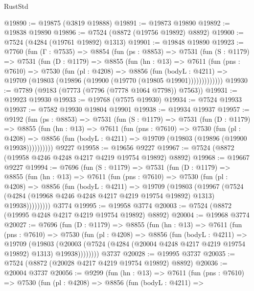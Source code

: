 \begin{lexlean}{RustStd}
\begin{coremodule}
@19890 := @19875 (@3819 @19888)
@19891 := @19873 @19890
@19892 := @19838 @19890
@19896 := @7524 (@8872 (@19756 @19892) @8892)
@19900 := @7524 (@4284 (@19761 @19892) @1313)
@19901 := @19848 @19890
@19923 := @7760
    (fun (Γ : @7535) =>
    @8854
      (fun (ps : @8853) =>
      @7531
        (fun (S : @1179) =>
        @7531
          (fun (D : @1179) =>
          @8855
            (fun (hn : @13) =>
            @7611
              (fun (pns : @7610) =>
              @7530
                (fun (pl : @4208) =>
                @8856
                  (fun (bodyL : @4211) =>
                  @19709 (@19803 (@19896 (@19900 (@19770 (@19805 @19901)))))))))))))
@19930 := @7789 (@9183 (@7773 (@7796 (@7778 @1064 @7798)) @7563))
@19931 := @19923 @19930
@19933 := @19768 (@7575 @19930)
@19934 := @7524 @19933
@19937 := @7582 @19930 @19804 @19901
@19938 := @19934 @19937
@19957 := @9192
    (fun (ps : @8853) =>
    @7531
      (fun (S : @1179) =>
      @7531
        (fun (D : @1179) =>
        @8855
          (fun (hn : @13) =>
          @7611
            (fun (pns : @7610) =>
            @7530
              (fun (pl : @4208) =>
              @8856 (fun (bodyL : @4211) => @19709 (@19803 (@19896 (@19900 @19938))))))))))
    @9227
@19958 := @19656 @9227
@19967 := @7524 (@8872 (@19958 @4246 @4248 @4217 @4219 @19754 @19892) @8892)
@19968 := @19667 @9227
@19994 := @7696
    (fun (S : @1179) =>
    @7531
      (fun (D : @1179) =>
      @8855
        (fun (hn : @13) =>
        @7611
          (fun (pns : @7610) =>
          @7530
            (fun (pl : @4208) =>
            @8856
              (fun (bodyL : @4211) =>
              @19709
                (@19803
                  (@19967
                    (@7524
                      (@4284 (@19968 @4246 @4248 @4217 @4219 @19754 @19892) @1313)
                      @19938)))))))))
    @3774
@19995 := @19958 @3774
@20003 := @7524 (@8872 (@19995 @4248 @4217 @4219 @19754 @19892) @8892)
@20004 := @19968 @3774
@20027 := @7696
    (fun (D : @1179) =>
    @8855
      (fun (hn : @13) =>
      @7611
        (fun (pns : @7610) =>
        @7530
          (fun (pl : @4208) =>
          @8856
            (fun (bodyL : @4211) =>
            @19709
              (@19803
                (@20003 (@7524 (@4284 (@20004 @4248 @4217 @4219 @19754 @19892) @1313) @19938))))))))
    @3737
@20028 := @19995 @3737
@20035 := @7524 (@8872 (@20028 @4217 @4219 @19754 @19892) @8892)
@20036 := @20004 @3737
@20056 := @9299
    (fun (hn : @13) =>
    @7611
      (fun (pns : @7610) =>
      @7530
        (fun (pl : @4208) =>
        @8856
          (fun (bodyL : @4211) =>

\end{coremodule}
\end{lexlean}
